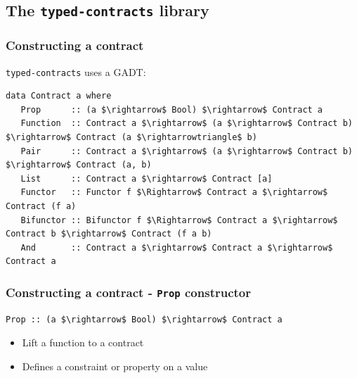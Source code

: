 \documentclass[]{beamer}
\begin{document}

\subsection{The \texttt{typed-contracts} library}

\begin{frame}[fragile]
\frametitle{Constructing a contract}

\texttt{typed-contracts} uses a GADT:

\begin{lstlisting}[mathescape]
data Contract a where
   Prop      :: (a $\rightarrow$ Bool) $\rightarrow$ Contract a
   Function  :: Contract a $\rightarrow$ (a $\rightarrow$ Contract b) $\rightarrow$ Contract (a $\rightarrowtriangle$ b)
   Pair      :: Contract a $\rightarrow$ (a $\rightarrow$ Contract b) $\rightarrow$ Contract (a, b)
   List      :: Contract a $\rightarrow$ Contract [a]
   Functor   :: Functor f $\Rightarrow$ Contract a $\rightarrow$ Contract (f a)
   Bifunctor :: Bifunctor f $\Rightarrow$ Contract a $\rightarrow$ Contract b $\rightarrow$ Contract (f a b)
   And       :: Contract a $\rightarrow$ Contract a $\rightarrow$ Contract a
\end{lstlisting}

\end{frame}

\begin{frame}[fragile]
\frametitle{Constructing a contract - \texttt{Prop} constructor}

\begin{lstlisting}[mathescape]
Prop :: (a $\rightarrow$ Bool) $\rightarrow$ Contract a
\end{lstlisting}

\begin{itemize}
	\item Lift a function to a contract
	\item Defines a constraint or property on a value
\end{itemize}

\end{frame}
\end{document}
